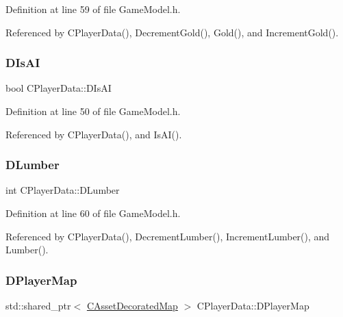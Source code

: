 Definition at line 59 of file Game\+Model.\+h.



Referenced by C\+Player\+Data(), Decrement\+Gold(), Gold(), and Increment\+Gold().

\hypertarget{classCPlayerData_ad3fcb8740d4e37b4654c01c8c595e6d5}{}\label{classCPlayerData_ad3fcb8740d4e37b4654c01c8c595e6d5} 
\subsubsection{\texorpdfstring{D\+Is\+AI}{DIsAI}}
{\footnotesize\ttfamily bool C\+Player\+Data\+::\+D\+Is\+AI\hspace{0.3cm}{\ttfamily [protected]}}



Definition at line 50 of file Game\+Model.\+h.



Referenced by C\+Player\+Data(), and Is\+A\+I().

\hypertarget{classCPlayerData_adf3bf2fa49b5c8a4fb9a478d95f688c4}{}\label{classCPlayerData_adf3bf2fa49b5c8a4fb9a478d95f688c4} 
\subsubsection{\texorpdfstring{D\+Lumber}{DLumber}}
{\footnotesize\ttfamily int C\+Player\+Data\+::\+D\+Lumber\hspace{0.3cm}{\ttfamily [protected]}}



Definition at line 60 of file Game\+Model.\+h.



Referenced by C\+Player\+Data(), Decrement\+Lumber(), Increment\+Lumber(), and Lumber().

\hypertarget{classCPlayerData_a452163191cd4603e1e38dd8d4bb9691c}{}\label{classCPlayerData_a452163191cd4603e1e38dd8d4bb9691c} 
\subsubsection{\texorpdfstring{D\+Player\+Map}{DPlayerMap}}
{\footnotesize\ttfamily std\+::shared\+\_\+ptr$<$ \hyperlink{classCAssetDecoratedMap}{C\+Asset\+Decorated\+Map} $>$ C\+Player\+Data\+::\+D\+Player\+Map\hspace{0.3cm}{\ttfamily [protected]}}




